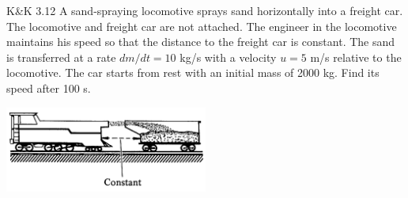 \documentclass{esg8012pset}
\begin{document}
\begin{problem}{K\&K 3.12}
  A sand-spraying locomotive sprays sand horizontally into a freight car. The locomotive and freight car are not attached. The engineer in the locomotive maintains his speed so that the distance to the freight car is constant. The sand is transferred at a rate $d m / d t = 10$ kg/s with a velocity $u = 5$ m/s relative to the locomotive. The car starts from rest with an initial mass of 2000 kg. Find its speed after 100 s.
  \begin{center}\includegraphics[width=0.5\textwidth]{ps_04_3}\end{center}
\end{problem}
\end{document}
